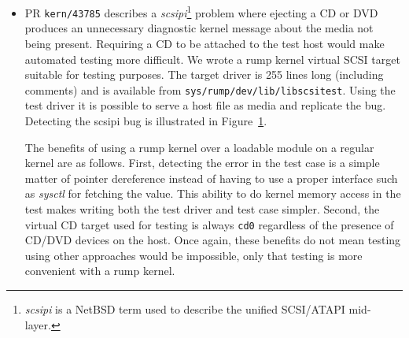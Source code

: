 \begin{itemize}
\begin{figure}[t]
{\tt \scriptsize
\begin{verbatim}
static void
scsitest_request(struct scsipi_channel *chan,
        scsipi_adapter_req_t req, void *arg)
{
        [....]

        case SCSI_SYNCHRONIZE_CACHE_10:
                if (isofd == -1) {
                        if ((xs->xs_control & XS_CTL_SILENT) == 0)
                                atomic_inc_uint(&rump_scsitest_err
                                    [RUMP_SCSITEST_NOISYSYNC]);
                        sense_notready(xs);
                }
                break;

        [....]
}
\end{verbatim}}
\caption[Flagging an error in the scsitest driver]{
\textbf{Flagging an error in the scsitest driver.}
The test is run with the test program as a local client and the error
is flagged.  After the test case has been run, the test program examines
the variable to see if the problem triggered.  Direct access to the
rump kernel's memory avoids having to return test information out of
the kernel with more complex interfaces such as \textit{sysctl}.
}
\label{fig:scsitest}
\end{figure}

\item   PR \texttt{kern/43785} describes a \textit{scsipi}\footnote{
		\textit{scsipi} is a NetBSD term used to describe
		the unified SCSI/ATAPI mid-layer.
	}
	problem where ejecting a CD or DVD produces an unnecessary
	diagnostic kernel message about the media not being present.
	Requiring a CD to be attached to the test host would make
	automated testing more difficult.  We
	wrote a rump kernel virtual SCSI target suitable for testing
	purposes.  The target driver is 255 lines long (including
	comments) and is available from
	\texttt{sys/rump/dev/lib/libscsitest}.  Using the test
	driver it is possible to serve a host file as media and
	replicate the bug.  Detecting the scsipi bug is illustrated
	in Figure~\ref{fig:scsitest}.

	The benefits of using a rump kernel over a loadable module
	on a regular kernel are as follows.  First, detecting the
	error in the test case is a simple matter of pointer
	dereference instead of having to use a proper interface
	such as \textit{sysctl} for fetching the value.  This ability to
	do kernel memory access in the test makes
	writing both the test driver and test case simpler.  Second,
	the virtual CD target used for testing is always \texttt{cd0}
	regardless of the presence of CD/DVD devices on the host.
	Once again, these benefits do not mean testing using other
	approaches would be impossible, only that testing is more
	convenient with a rump kernel.
\end{itemize}

